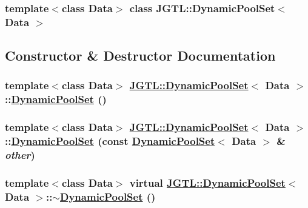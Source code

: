 \subsubsection*{template$<$class Data$>$ class JGTL::Dynamic\-Pool\-Set$<$ Data $>$}



\subsection{Constructor \& Destructor Documentation}
\hypertarget{class_j_g_t_l_1_1_dynamic_pool_set_7782c2398e24e10e1a4e4b6571740fb2}{
\subsubsection[DynamicPoolSet]{\setlength{\rightskip}{0pt plus 5cm}template$<$class Data$>$ \hyperlink{class_j_g_t_l_1_1_dynamic_pool_set}{JGTL::Dynamic\-Pool\-Set}$<$ Data $>$::\hyperlink{class_j_g_t_l_1_1_dynamic_pool_set}{Dynamic\-Pool\-Set} ()}}
\label{class_j_g_t_l_1_1_dynamic_pool_set_7782c2398e24e10e1a4e4b6571740fb2}


\hypertarget{class_j_g_t_l_1_1_dynamic_pool_set_d079124f4b30c87f7bb102f306f7c7ae}{
\subsubsection[DynamicPoolSet]{\setlength{\rightskip}{0pt plus 5cm}template$<$class Data$>$ \hyperlink{class_j_g_t_l_1_1_dynamic_pool_set}{JGTL::Dynamic\-Pool\-Set}$<$ Data $>$::\hyperlink{class_j_g_t_l_1_1_dynamic_pool_set}{Dynamic\-Pool\-Set} (const \hyperlink{class_j_g_t_l_1_1_dynamic_pool_set}{Dynamic\-Pool\-Set}$<$ Data $>$ \& {\em other})}}
\label{class_j_g_t_l_1_1_dynamic_pool_set_d079124f4b30c87f7bb102f306f7c7ae}


\hypertarget{class_j_g_t_l_1_1_dynamic_pool_set_61626b46e2bd79d1c188ff76725ac50c}{
\subsubsection[$\sim$DynamicPoolSet]{\setlength{\rightskip}{0pt plus 5cm}template$<$class Data$>$ virtual \hyperlink{class_j_g_t_l_1_1_dynamic_pool_set}{JGTL::Dynamic\-Pool\-Set}$<$ Data $>$::$\sim$\hyperlink{class_j_g_t_l_1_1_dynamic_pool_set}{Dynamic\-Pool\-Set} ()}}
\label{class_j_g_t_l_1_1_dynamic_pool_set_61626b46e2bd79d1c188ff76725ac50c}




